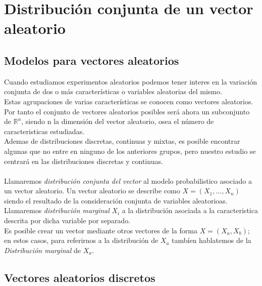 \section{Distribución conjunta de un vector aleatorio}


\subsection{Modelos para vectores aleatorios}

Cuando estudiamos experimentos aleatorios podemos tener interes en la variación conjunta de dos o más características o variables aleatorias del mismo. \\
Estas agrupaciones de varias características se conocen como vectores aleatorios. 
Por tanto el conjunto de vectores aleatorios posibles será ahora un subconjunto de 
\(\mathbb{R}^n\), siendo n la dimensión del vector aleatorio, osea el número de caracteristicas 
estudiadas. \\
Ademas de distribuciones discretas, continuas y mixtas, es posible encontrar algunas que no entre en ninguno
de los anteriores grupos, pero nuestro estudio se centrará en las distribuciones discretas y continuas. \\ \\

Llamaremos \textit{distribución conjunta del vector} al modelo probabilistico asociado a un vector aleatorio.
Un vector aleatorio se describe como \(X = (X_1, ... , X_n)\) siendo el resultado de la consideración conjunta de variables aleatorioas. 
Llamaremos \textit{distribución marginal} \(X_i\) a la distribución asociada a la caracteristica descrita por dicha variable por separado. \\
Es posible crear un vector mediante otros vectores de la forma \(X = (X_a, X_b)\); en estos casos, para referirnos a la distribución de \(X_a\) tambíen hablatemos de la \textit{Distribución marginal} de \(X_a\).

\subsection{Vectores aleatorios discretos}

